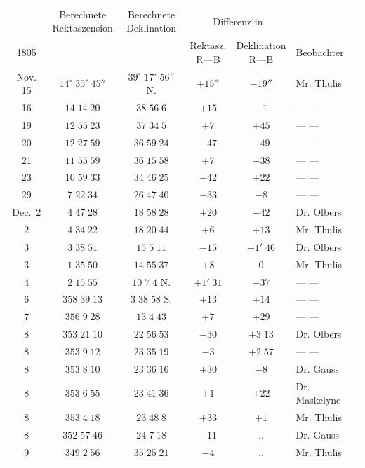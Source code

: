 \begin{center}\begingroup
\fontsize{9}{11}\selectfont
\setlength{\tabcolsep}{2pt}\renewcommand{\arraystretch}{1.12}
\begin{tabular}{c|cc|cc|l}
& \shortstack{Berechnete\\Rektaszension} & \shortstack{Berechnete\\Deklination} & \multicolumn{2}{c|}{Differenz in} & \\
1805 & & & \shortstack{Rektasz.\\R---B} & \shortstack{Deklination\\R---B} & Beobachter \\
\hline
Nov. 15 & $14^\circ\;35'\;45''$ & $39^\circ\;17'\;56''$ N. & $+15''$ & $-19''$ & Mr. Thulis \\
16 & $14\;14\;20$ & $38\;56\;6$ & $+15$ & $-1$ & --- --- \\
19 & $12\;55\;23$ & $37\;34\;5$ & $+7$ & $+45$ & --- --- \\
20 & $12\;27\;59$ & $36\;59\;24$ & $-47$ & $-49$ & --- --- \\
21 & $11\;55\;59$ & $36\;15\;58$ & $+7$ & $-38$ & --- --- \\
23 & $10\;59\;33$ & $34\;46\;25$ & $-42$ & $+22$ & --- --- \\
29 & $7\;22\;34$ & $26\;47\;40$ & $-33$ & $-8$ & --- --- \\
Dec.\ 2 & $4\;47\;28$ & $18\;58\;28$ & $+20$ & $-42$ & Dr. Olbers \\
2 & $4\;34\;22$ & $18\;20\;44$ & $+6$ & $+13$ & Mr. Thulis \\
3 & $3\;38\;51$ & $15\;5\;11$ & $-15$ & $-1'\;46$ & Dr. Olbers \\
3 & $1\;35\;50$ & $14\;55\;37$ & $+8$ & $0$ & Mr. Thulis \\
4 & $2\;15\;55$ & $10\;7\;4$ N. & $+1'\;31$ & $-37$ & --- --- \\
6 & $358\;39\;13$ & $3\;38\;58$ S. & $+13$ & $+14$ & --- --- \\
7 & $356\;9\;28$ & $13\;4\;43$ & $+7$ & $+29$ & --- --- \\
8 & $353\;21\;10$ & $22\;56\;53$ & $-30$ & $+3\;13$ & Dr. Olbers \\
8 & $353\;9\;12$ & $23\;35\;19$ & $-3$ & $+2\;57$ & --- --- \\
8 & $353\;8\;10$ & $23\;36\;16$ & $+30$ & $-8$ & Dr. Gauss \\
8 & $353\;6\;55$ & $23\;41\;36$ & $+1$ & $+22$ & Dr. Maskelyne \\
8 & $353\;4\;18$ & $23\;48\;8$ & $+33$ & $+1$ & Mr. Thulis \\
8 & $352\;57\;46$ & $24\;7\;18$ & $-11$ & .\quad . & Dr. Gauss \\
9 & $349\;2\;56$ & $35\;25\;21$ & $-4$ & .\quad . & Mr. Thulis \\
\end{tabular}\endgroup\end{center}
